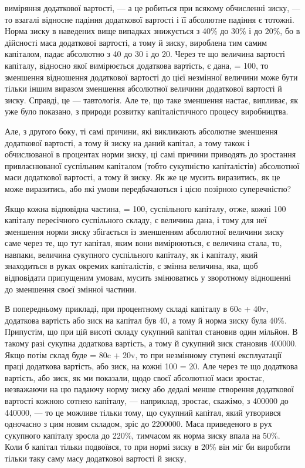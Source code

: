 виміряння додаткової вартості, — а це робиться при всякому
обчисленні зиску, — то взагалі відносне падіння додаткової вартості
і її абсолютне падіння є тотожні. Норма зиску в наведених
вище випадках знижується з 40\% до 30\% і до 20\%, бо в дійсності
маса додаткової вартості, а тому й зиску, вироблена тим
самим капіталом, падає абсолютно з 40 до 30 і до 20. Через те
що величина вартості капіталу, відносно якої вимірюється додаткова
вартість, є дана, = 100, то зменшення відношення додаткової
вартості до цієї незмінної величини може бути тільки іншим
виразом зменшення абсолютної величини додаткової вартості
й зиску. Справді, це — тавтологія. Але те, що таке зменшення
настає, випливає, як уже було показано, з природи розвитку
капіталістичного процесу виробництва.

Але, з другого боку, ті самі причини, які викликають абсолютне
зменшення додаткової вартості, а тому й зиску на даний
капітал, а тому також і обчислюваної в процентах норми зиску,
ці самі причини приводять до зростання привласнюваної суспільним
капіталом (тобто сукупністю капіталістів) абсолютної маси
додаткової вартості, а тому й зиску. Як же це мусить виразитись,
як це може виразитись, або які умови передбачаються
і цією позірною суперечністю?

Якщо кожна відповідна частина, = 100, суспільного капіталу,
отже, кожні 100 капіталу пересічного суспільного складу, є величина
дана, і тому для неї зменшення норми зиску збігається
із зменшенням абсолютної величини зиску саме через те, що
тут капітал, яким вони вимірюються, є величина стала, то,
навпаки, величина сукупного суспільного капіталу, як і капіталу,
який знаходиться в руках окремих капіталістів, є змінна
величина, яка, щоб відповідати припущеним умовам, мусить
змінюватись у зворотному відношенні до зменшення своєї змінної
частини.

В попередньому прикладі, при процентному складі капіталу
в 60c + 40v, додаткова вартість або зиск на капітал був 40,
а тому й норма зиску була 40\%. Припустім, що при цій висоті
складу сукупний капітал становив один мільйон. В такому разі
сукупна додаткова вартість, а тому й сукупний зиск становив
400000. Якщо потім склад буде = 80c + 20v, то при незмінному
ступені експлуатації праці додаткова вартість, або зиск, на кожні
100 = 20. Але через те що додаткова вартість, або зиск, як ми
показали, щодо своєї абсолютної маси зростає, незважаючи на цю
падаючу норму зиску або дедалі менше створення додаткової
вартості кожною сотнею капіталу, — наприклад, зростає, скажімо,
з 400000 до 440000, — то це можливе тільки тому, що сукупний
капітал, який утворився одночасно з цим новим складом, зріс
до 2200000. Маса приведеного в рух сукупного капіталу зросла
до 220\%, тимчасом як норма зиску впала на 50\%. Коли б капітал
тільки подвоївся, то при нормі зиску в 20\% він міг би
виробити тільки таку саму масу додаткової вартості й зиску,

